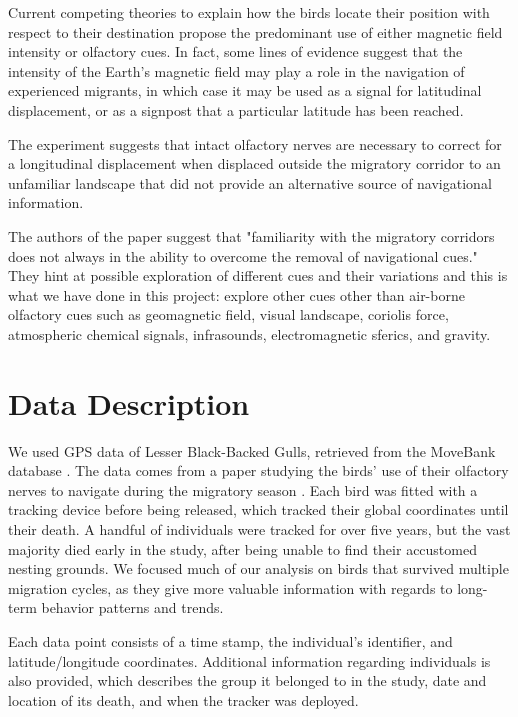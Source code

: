 \documentclass[letterpaper, 10pt, conference]{ieeeconf}  %
\begin{document}
    Current competing theories \cite{wallbook} to explain how the birds locate their position with respect to their destination propose the predominant use of either magnetic field intensity or olfactory cues. In fact, some lines of evidence suggest that the intensity of the Earth’s magnetic field may play a role in the navigation of experienced migrants, in which case it may be used as a signal for latitudinal displacement, or as a signpost that a particular latitude has been reached.
    
    The experiment suggests that intact olfactory nerves are necessary to correct for a longitudinal displacement when displaced outside the migratory corridor to an unfamiliar landscape that did not provide an alternative source of navigational information.
    
    The authors of the paper suggest that "familiarity with the migratory corridors does not always in the ability to overcome the removal of navigational cues." They hint at possible exploration of different cues and their variations and this is what we have done in this project: explore other cues other than air-borne olfactory cues such as geomagnetic field, visual landscape, coriolis force, atmospheric chemical signals, infrasounds, electromagnetic sferics, and gravity.

\section{Data Description} \label{datadescript}
	We used GPS data of Lesser Black-Backed Gulls, retrieved from the MoveBank database \cite{data}. The data comes from a paper studying the birds' use of their olfactory nerves to navigate during the migratory season \cite{paper}. Each bird was fitted with a tracking device before being released, which tracked their global coordinates until their death. A handful of individuals were tracked for over five years, but the vast majority died early in the study, after being unable to find their accustomed nesting grounds. We focused much of our analysis on birds that survived multiple migration cycles, as they give more valuable information with regards to long-term behavior patterns and trends.
    
    Each data point consists of a time stamp, the individual's identifier, and latitude/longitude coordinates. Additional information regarding individuals is also provided, which describes the group it belonged to in the study, date and location of its death, and when the tracker was deployed. 
    
\end{document}

